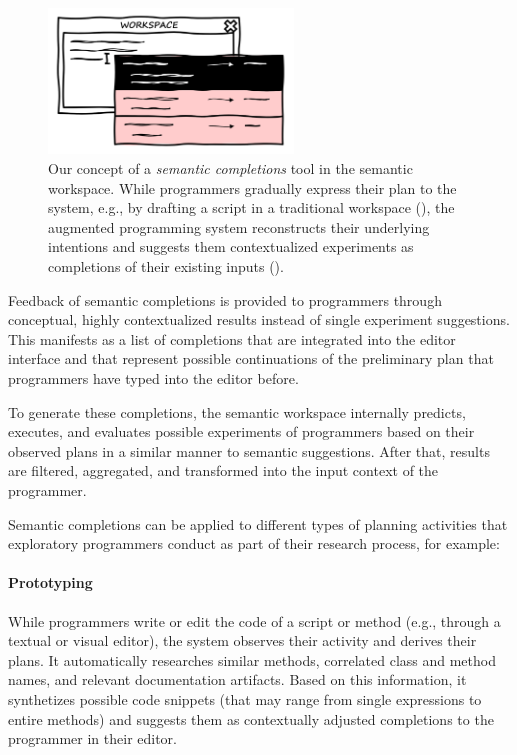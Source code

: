 \begin{figure}
	\centering
	\includegraphics[width=0.58\textwidth]{02_workspace/completions.png}
	\caption[Our concept of a \emph{semantic completions} tool in the semantic workspace.]{
		Our concept of a \emph{semantic completions} tool in the semantic workspace.
		While programmers gradually express their plan to the system, e.g., by drafting a script in a traditional workspace (\bold{\textcolor{gray}{gray}}), the augmented programming system reconstructs their underlying intentions and suggests them contextualized experiments as completions of their existing inputs (\bold{\textcolor{red}{red}}).
	}
	\label{fig:approach/workspace/completions}
\end{figure}

Feedback of semantic completions is provided to programmers through conceptual, highly contextualized results instead of single experiment suggestions.
This manifests as a list of completions that are integrated into the editor interface and that represent possible continuations of the preliminary plan that programmers have typed into the editor before.

To generate these completions, the semantic workspace internally predicts, executes, and evaluates possible experiments of programmers based on their observed plans in a similar manner to semantic suggestions.
After that, results are filtered, aggregated, and transformed into the input context of the programmer.

Semantic completions can be applied to different types of planning activities that exploratory programmers conduct as part of their research process, for example:

\paragraph{Prototyping}
While programmers write or edit the code of a script or method (e.g., through a textual or visual editor), the system observes their activity and derives their plans.
It automatically researches similar methods, correlated class and method names, and relevant documentation artifacts.
Based on this information, it synthetizes possible code snippets (that may range from single expressions to entire methods) and suggests them as contextually adjusted completions to the programmer in their editor.

